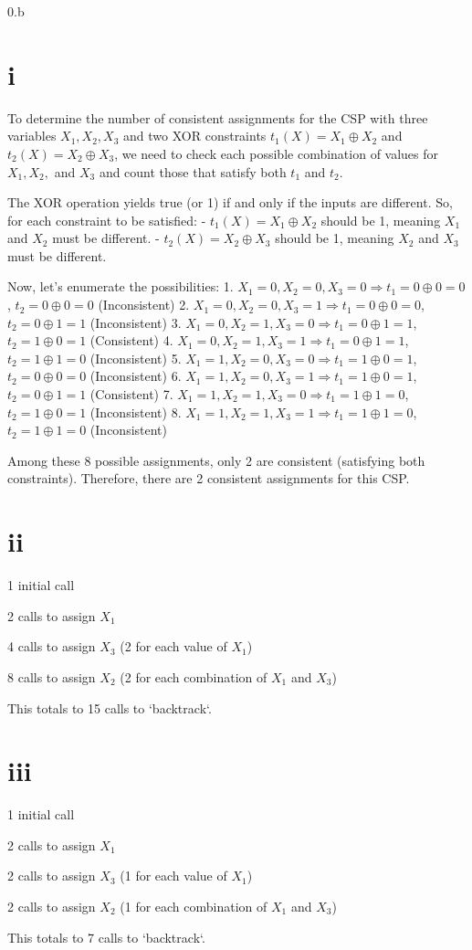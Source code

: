 \LARGE
0.b
\normalsize

\begin{answer}
\section{i}
To determine the number of consistent assignments for the CSP with three variables $X_1, X_2, X_3$ and two XOR constraints $t_1(X) = X_1 \oplus X_2$ and $t_2(X) = X_2 \oplus X_3$, we need to check each possible combination of values for $X_1, X_2,$ and $X_3$ and count those that satisfy both $t_1$ and $t_2$.

The XOR operation yields true (or 1) if and only if the inputs are different. So, for each constraint to be satisfied:
- $t_1(X) = X_1 \oplus X_2$ should be 1, meaning $X_1$ and $X_2$ must be different.
- $t_2(X) = X_2 \oplus X_3$ should be 1, meaning $X_2$ and $X_3$ must be different.

Now, let's enumerate the possibilities:
1. $X_1 = 0, X_2 = 0, X_3 = 0 \Rightarrow t_1 = 0 \oplus 0 = 0$, $t_2 = 0 \oplus 0 = 0$ (Inconsistent)
2. $X_1 = 0, X_2 = 0, X_3 = 1 \Rightarrow t_1 = 0 \oplus 0 = 0$, $t_2 = 0 \oplus 1 = 1$ (Inconsistent)
3. $X_1 = 0, X_2 = 1, X_3 = 0 \Rightarrow t_1 = 0 \oplus 1 = 1$, $t_2 = 1 \oplus 0 = 1$ (Consistent)
4. $X_1 = 0, X_2 = 1, X_3 = 1 \Rightarrow t_1 = 0 \oplus 1 = 1$, $t_2 = 1 \oplus 1 = 0$ (Inconsistent)
5. $X_1 = 1, X_2 = 0, X_3 = 0 \Rightarrow t_1 = 1 \oplus 0 = 1$, $t_2 = 0 \oplus 0 = 0$ (Inconsistent)
6. $X_1 = 1, X_2 = 0, X_3 = 1 \Rightarrow t_1 = 1 \oplus 0 = 1$, $t_2 = 0 \oplus 1 = 1$ (Consistent)
7. $X_1 = 1, X_2 = 1, X_3 = 0 \Rightarrow t_1 = 1 \oplus 1 = 0$, $t_2 = 1 \oplus 0 = 1$ (Inconsistent)
8. $X_1 = 1, X_2 = 1, X_3 = 1 \Rightarrow t_1 = 1 \oplus 1 = 0$, $t_2 = 1 \oplus 1 = 0$ (Inconsistent)

Among these 8 possible assignments, only 2 are consistent (satisfying both constraints). Therefore, there are 2 consistent assignments for this CSP.


\section{ii}

1 initial call

2 calls to assign $X_1$

4 calls to assign $X_3$ (2 for each value of $X_1$)

8 calls to assign $X_2$ (2 for each combination of $X_1$ and $X_3$)

This totals to 15 calls to `backtrack`.

\section{iii}
1 initial call

2 calls to assign $X_1$

2 calls to assign $X_3$ (1 for each value of $X_1$)

2 calls to assign $X_2$ (1 for each combination of $X_1$ and $X_3$)

This totals to 7 calls to `backtrack`.
\end{answer}

